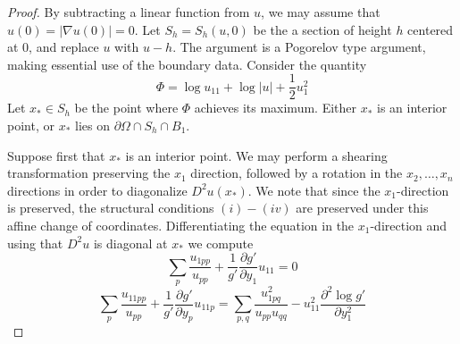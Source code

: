 \documentclass[12pt,reqno]{amsart}
\newcommand{\del}{\partial}
\numberwithin{equation}{section}
\begin{document}
\begin{proof}
    By subtracting a linear function from $u$, we may assume that $u(0)= |\nabla u(0)|=0$.  Let $S_h= S_h(u,0)$ be the a section of height $h$ centered at $0$, and replace $u$ with $u-h$.  The argument is a Pogorelov type argument, making essential use of the boundary data.  Consider the quantity
\[
\Phi = \log u_{11} + \log|u| + \frac{1}{2}u_1^2
\]
    Let $x_* \in S_h$ be the point where $\Phi$ achieves its maximum.  Either $x_*$ is an interior point, or $x_*$ lies on $\del\Omega \cap S_h\cap B_1$. 

Suppose first that $x_*$ is an interior point. We may perform a shearing transformation preserving the $x_1$ direction, followed by a rotation in the $x_2,\ldots,x_n$ directions in order to diagonalize $D^2u(x_*)$.  We note that since the $x_1$-direction is preserved, the structural conditions $(i)-(iv)$ are preserved under this affine change of coordinates. Differentiating the equation in the $x_1$-direction and using that $D^2u$ is diagonal at $x_*$  we compute
\begin{equation}\label{eq: LinearizedEquation}
\sum_p \frac{u_{1pp}}{u_{pp}}  + \frac{1}{g'}\frac{\del g'}{\del y_1}u_{11} = 0
\end{equation}
\begin{equation}\label{eq: concavityEquation}
\sum_p \frac{u_{11pp}}{u_{pp}} + \frac{1}{g'}\frac{\del g'}{\del y_p}u_{11p} = \sum_{p,q}\frac{u_{1pq}^2} {u_{pp}u_{qq}}-u_{11}^2\frac{\del^2 \log g'}{\del y_1^2}
\end{equation}


\end{proof}
\end{document}
